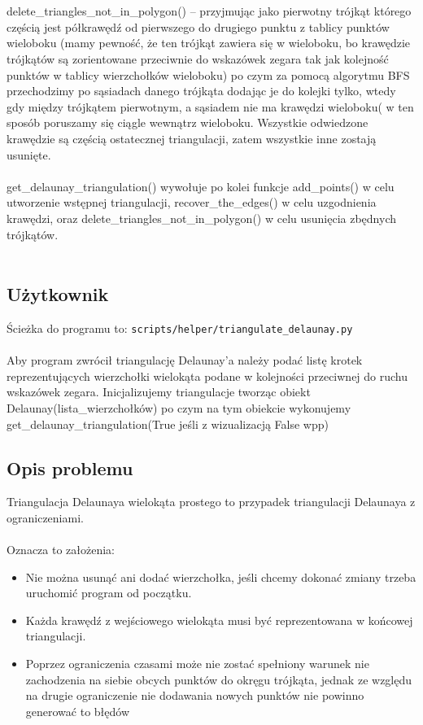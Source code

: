 \documentclass[12pt]{article}
\begin{document}
\\ \\ 
delete\_triangles\_not\_in\_polygon() – przyjmując jako pierwotny trójkąt którego częścią jest półkrawędź od pierwszego do drugiego punktu z tablicy punktów wieloboku (mamy pewność, że ten trójkąt zawiera się w wieloboku, bo krawędzie trójkątów są zorientowane przeciwnie do wskazówek zegara tak jak kolejność punktów w tablicy wierzchołków wieloboku) po czym za pomocą algorytmu BFS przechodzimy po sąsiadach danego trójkąta dodając je do kolejki tylko, wtedy gdy między trójkątem pierwotnym, a sąsiadem nie ma krawędzi wieloboku( w ten sposób poruszamy się ciągle wewnątrz wieloboku. Wszystkie odwiedzone krawędzie są częścią ostatecznej triangulacji, zatem wszystkie inne zostają usunięte.
\\ \\ 
get\_delaunay\_triangulation() wywołuje po kolei funkcje add\_points() w celu utworzenie wstępnej triangulacji, recover\_the\_edges() w celu uzgodnienia krawędzi, oraz delete\_triangles\_not\_in\_polygon() w celu usunięcia zbędnych trójkątów.
\\ \\ 

\newpage

\subsection*{Użytkownik}
Ścieżka do programu to: \verb|scripts/helper/triangulate_delaunay.py|
\\ \\
Aby program zwrócił triangulację Delaunay’a należy podać listę krotek reprezentujących wierzchołki wielokąta podane w kolejności przeciwnej do ruchu wskazówek zegara. Inicjalizujemy triangulacje tworząc obiekt Delaunay(lista\_wierzchołków) po czym na tym obiekcie wykonujemy get\_delaunay\_triangulation(True jeśli z wizualizacją False wpp)

\subsection*{Opis problemu}
Triangulacja Delaunaya wielokąta prostego to przypadek triangulacji Delaunaya  z ograniczeniami.
\\ \\ 
Oznacza to założenia:
\begin{itemize}[noitemsep]
	\item Nie można usunąć ani dodać wierzchołka, jeśli chcemy dokonać zmiany trzeba uruchomić program od początku.
	\item Każda krawędź z wejściowego wielokąta musi być reprezentowana w końcowej triangulacji.
	\item Poprzez ograniczenia czasami może nie zostać spełniony warunek nie zachodzenia na siebie obcych punktów do okręgu trójkąta, jednak ze względu na drugie ograniczenie nie dodawania nowych punktów nie powinno generować to błędów
\end{itemize}
\end{document}
